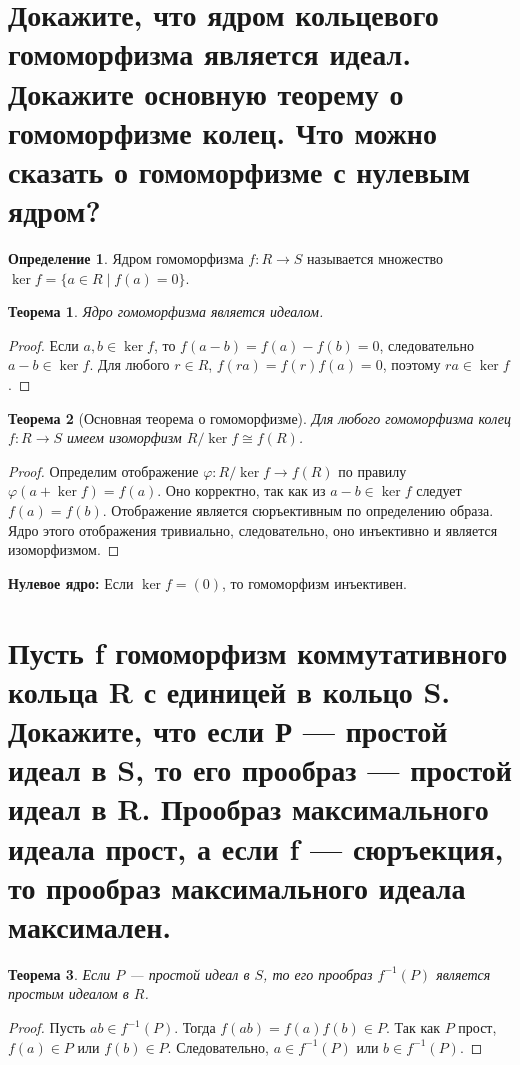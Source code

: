 \documentclass[12pt, a4paper]{article}
\theoremstyle{definition}
\newtheorem{definition}{Определение}[section]
\theoremstyle{plain}
\newtheorem{theorem}{Теорема}[section]
\begin{document}
	\newpage
	\section{Докажите, что ядром кольцевого гомоморфизма является идеал. Докажите основную теорему о гомоморфизме колец. Что можно сказать о гомоморфизме с нулевым ядром?}
	
	\begin{definition}
		Ядром гомоморфизма $f: R \to S$ называется множество $\ker f = \{a \in R \mid f(a)=0\}$.
	\end{definition}
	
	\begin{theorem}
		Ядро гомоморфизма является идеалом.
	\end{theorem}
	\begin{proof}
		Если $a, b \in \ker f$, то $f(a-b)=f(a)-f(b)=0$, следовательно $a-b \in \ker f$. Для любого $r \in R$, $f(ra)=f(r)f(a)=0$, поэтому $ra \in \ker f$.
	\end{proof}
	
	\begin{theorem}[Основная теорема о гомоморфизме]
		Для любого гомоморфизма колец $f: R \to S$ имеем изоморфизм $R/\ker f \cong f(R)$.
	\end{theorem}
	\begin{proof}
		Определим отображение $\varphi: R/\ker f \to f(R)$ по правилу $\varphi(a+\ker f) = f(a)$. Оно корректно, так как из $a-b \in \ker f$ следует $f(a)=f(b)$. Отображение является сюръективным по определению образа. Ядро этого отображения тривиально, следовательно, оно инъективно и является изоморфизмом.
	\end{proof}
	
	\textbf{Нулевое ядро:} Если $\ker f = (0)$, то гомоморфизм инъективен.
	
	\newpage
	\section{Пусть f гомоморфизм коммутативного кольца R с единицей в кольцо S. Докажите, что если Р --- простой идеал в S, то его прообраз --- простой идеал в R. Прообраз максимального идеала прост, а если f --- сюръекция, то прообраз максимального идеала максимален.}
	
	\begin{theorem}
		Если $P$ — простой идеал в $S$, то его прообраз $f^{-1}(P)$ является простым идеалом в $R$.
	\end{theorem}
	\begin{proof}
		Пусть $ab \in f^{-1}(P)$. Тогда $f(ab) = f(a)f(b) \in P$. Так как $P$ прост, $f(a) \in P$ или $f(b) \in P$. Следовательно, $a \in f^{-1}(P)$ или $b \in f^{-1}(P)$.
	\end{proof}
	
\end{document}
